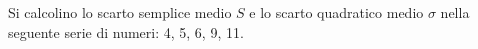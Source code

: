 Si calcolino lo scarto semplice medio $S$ 
e lo scarto quadratico medio
$\sigma$ nella seguente serie di numeri:
4, 5, 6, 9,	11.